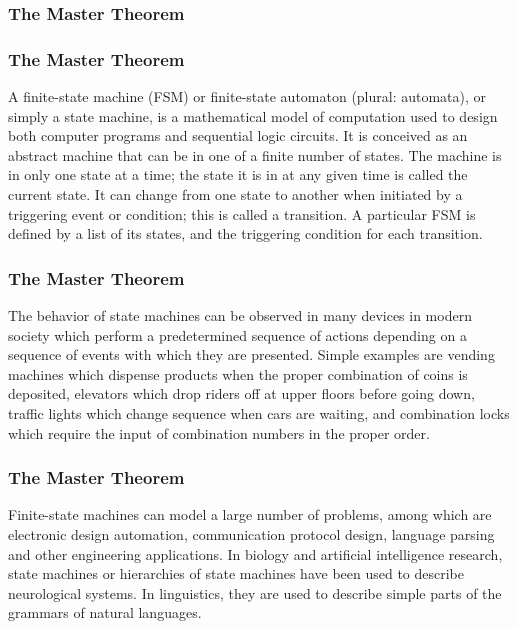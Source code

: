 
\begin{frame}
	\frametitle{The Master Theorem}
	\end{frame}
\begin{frame}
	\frametitle{The Master Theorem}
	A finite-state machine (FSM) or finite-state automaton (plural: automata), or simply a state machine, is a mathematical model of computation used to design both computer programs and sequential logic circuits. It is conceived as an abstract machine that can be in one of a finite number of states. The machine is in only one state at a time; the state it is in at any given time is called the current state. It can change from one state to another when initiated by a triggering event or condition; this is called a transition. A particular FSM is defined by a list of its states, and the triggering condition for each transition.
\end{frame}
\begin{frame}
	\frametitle{The Master Theorem}
	The behavior of state machines can be observed in many devices in modern society which perform a predetermined sequence of actions depending on a sequence of events with which they are presented. Simple examples are vending machines which dispense products when the proper combination of coins is deposited, elevators which drop riders off at upper floors before going down, traffic lights which change sequence when cars are waiting, and combination locks which require the input of combination numbers in the proper order.
\end{frame}
\begin{frame}
	\frametitle{The Master Theorem}
	Finite-state machines can model a large number of problems, among which are electronic design automation, communication protocol design, language parsing and other engineering applications. In biology and artificial intelligence research, state machines or hierarchies of state machines have been used to describe neurological systems. In linguistics, they are used to describe simple parts of the grammars of natural languages.
\end{frame}
